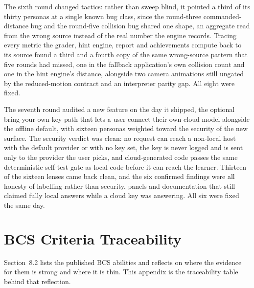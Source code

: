 \documentclass[11pt,a4paper]{report}
\begin{document}
The sixth round changed tactics: rather than sweep blind, it pointed a third of its thirty personas at a single known bug class, since the round-three commanded-distance bug and the round-five collision bug shared one shape, an aggregate read from the wrong source instead of the real number the engine records. Tracing every metric the grader, hint engine, report and achievements compute back to its source found a third and a fourth copy of the same wrong-source pattern that five rounds had missed, one in the fallback application's own collision count and one in the hint engine's distance, alongside two camera animations still ungated by the reduced-motion contract and an interpreter parity gap. All eight were fixed.

The seventh round audited a new feature on the day it shipped, the optional bring-your-own-key path that lets a user connect their own cloud model alongside the offline default, with sixteen personas weighted toward the security of the new surface. The security verdict was clean: no request can reach a non-local host with the default provider or with no key set, the key is never logged and is sent only to the provider the user picks, and cloud-generated code passes the same deterministic self-test gate as local code before it can reach the learner. Thirteen of the sixteen lenses came back clean, and the six confirmed findings were all honesty of labelling rather than security, panels and documentation that still claimed fully local answers while a cloud key was answering. All six were fixed the same day.

\chapter{BCS Criteria Traceability}
\label{app:bcs}
Section~8.2 lists the published BCS abilities and reflects on where the evidence for them is strong and where it is thin. This appendix is the traceability table behind that reflection.
\end{document}
